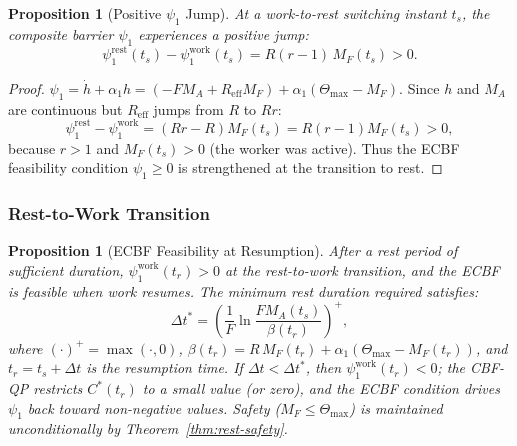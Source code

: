 \documentclass[11pt,a4paper]{article}
\newtheorem{proposition}[theorem]{Proposition}
\begin{document}
\begin{proposition}[Positive $\psi_1$ Jump]
At a work-to-rest switching instant $t_s$, the composite barrier
$\psi_1$ experiences a positive jump:
\begin{equation}\label{eq:psi1-jump}
\psi_1^{\mathrm{rest}}(t_s) - \psi_1^{\mathrm{work}}(t_s) = R(r-1)\,M_F(t_s) > 0.
\end{equation}
\end{proposition}

\begin{proof}
$\psi_1 = \dot h + \alpha_1 h = (-F M_A + R_{\mathrm{eff}} M_F) +
\alpha_1(\Theta_{\max} - M_F)$. Since $h$ and $M_A$ are continuous but
$R_{\mathrm{eff}}$ jumps from $R$ to $Rr$:
\[
\psi_1^{\mathrm{rest}} - \psi_1^{\mathrm{work}} = (Rr - R) M_F(t_s) = R(r-1) M_F(t_s) > 0,
\]
because $r > 1$ and $M_F(t_s) > 0$ (the worker was active). Thus the
ECBF feasibility condition $\psi_1 \geq 0$ is strengthened at the
transition to rest.
\end{proof}

\subsubsection{Rest-to-Work Transition}

\begin{proposition}[ECBF Feasibility at Resumption]
After a rest period of sufficient duration,
$\psi_1^{\mathrm{work}}(t_r) > 0$ at the rest-to-work transition,
and the ECBF is feasible when work resumes. The minimum rest duration
required satisfies:
\begin{equation}\label{eq:dt-min}
\Delta t^* = \left(\frac{1}{F} \ln\frac{F M_A(t_s)}{\beta(t_r)}\right)^{+},
\end{equation}
where $(\cdot)^+ = \max(\cdot, 0)$, $\beta(t_r) = R\,M_F(t_r) +
\alpha_1(\Theta_{\max} - M_F(t_r))$, and $t_r = t_s + \Delta t$ is the
resumption time. If $\Delta t < \Delta t^*$, then
$\psi_1^{\mathrm{work}}(t_r) < 0$; the CBF-QP restricts $C^*(t_r)$ to
a small value (or zero), and the ECBF condition drives $\psi_1$ back
toward non-negative values. Safety ($M_F \leq \Theta_{\max}$) is
maintained unconditionally by Theorem~\ref{thm:rest-safety}.
\end{proposition}
\end{document}
